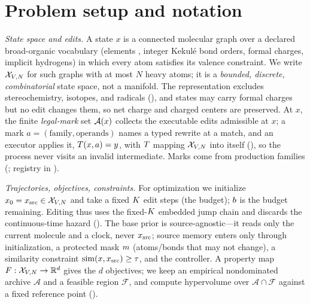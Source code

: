 \section{Problem setup and notation}
\label{sec:setup}

\emph{State space and edits.} A state $x$ is a connected molecular graph over a declared broad-organic
vocabulary (elements , integer Kekul\'e bond orders, formal charges,
implicit hydrogens) in which every atom satisfies its valence constraint. We write $\mathcal{X}_{V,N}$ for such graphs
with at most $N$ heavy atoms; it is a \emph{bounded, discrete, combinatorial} state space, not a manifold.
The representation excludes stereochemistry, isotopes, and radicals (), and states
may carry formal charges but no edit changes them, so net charge and charged centers are preserved. At
$x$, the finite \emph{legal-mark} set $\mathcal{A}(x)$ collects the executable edits admissible at $x$; a mark
$a=(\text{family},\text{operands})$ names a typed rewrite at a match, and an executor applies it,
$T(x,a)=y$, with $T$ mapping $\mathcal{X}_{V,N}$ into itself (), so the process never
visits an invalid intermediate. Marks come from  production families
(; registry in ).

\emph{Trajectories, objectives, constraints.} For optimization we initialize $x_0=x_{\mathrm{src}}\in\mathcal{X}_{V,N}$ and take a
fixed $K$ edit steps (the budget); $b$ is the budget remaining. Editing thus uses the
fixed-$K$ embedded jump chain and discards the continuous-time hazard (). The base
prior is source-agnostic---it reads only the current molecule and a clock, never $x_{\mathrm{src}}$; source memory
enters only through initialization, a protected mask $m$ (atoms/bonds that may not change), a
similarity constraint $\mathrm{sim}(x,x_{\mathrm{src}})\ge\tau$, and the controller. A property map $F:\mathcal{X}_{V,N}\to\mathbb{R}^d$
gives the $d$ objectives; we keep an empirical nondominated archive $\mathcal{A}$ and a feasible region
$\mathcal{F}$, and compute hypervolume over $\mathcal{A}\cap\mathcal{F}$ against a fixed reference point
().

